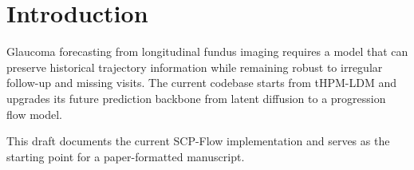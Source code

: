 \section{Introduction}

Glaucoma forecasting from longitudinal fundus imaging requires a model that can preserve historical trajectory information while remaining robust to irregular follow-up and missing visits. The current codebase starts from tHPM-LDM and upgrades its future prediction backbone from latent diffusion to a progression flow model.

This draft documents the current SCP-Flow implementation and serves as the starting point for a paper-formatted manuscript.
